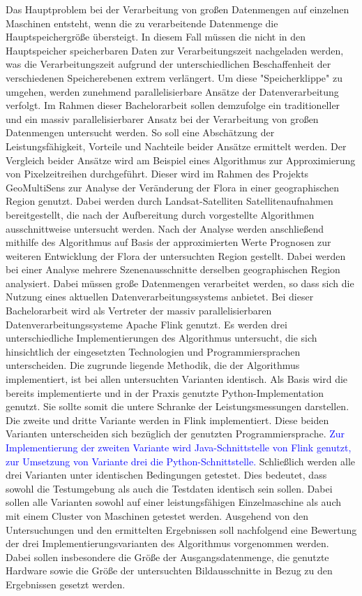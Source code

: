 \newline
Das Hauptproblem bei der Verarbeitung von großen Datenmengen auf einzelnen Maschinen entsteht, wenn die zu verarbeitende Datenmenge die Hauptspeichergröße übersteigt. In diesem Fall müssen die nicht in den Hauptspeicher speicherbaren Daten zur Verarbeitungszeit nachgeladen werden, was die Verarbeitungszeit aufgrund der unterschiedlichen Beschaffenheit der verschiedenen Speicherebenen extrem verlängert. Um diese "Speicherklippe" zu umgehen, werden zunehmend parallelisierbare Ansätze der Datenverarbeitung verfolgt.
Im Rahmen dieser Bachelorarbeit sollen demzufolge ein traditioneller und ein massiv parallelisierbarer Ansatz bei der Verarbeitung von großen Datenmengen untersucht werden. So soll eine Abschätzung der Leistungsfähigkeit, Vorteile und Nachteile beider Ansätze ermittelt werden. Der Vergleich beider Ansätze wird am Beispiel eines Algorithmus zur Approximierung von Pixelzeitreihen durchgeführt. Dieser wird im Rahmen des Projekts GeoMultiSens\cite{GeoMultiSensWebsite} zur Analyse der Veränderung der Flora in einer geographischen Region genutzt. Dabei werden durch Landsat-Satelliten Satellitenaufnahmen bereitgestellt, die nach der Aufbereitung durch vorgestellte Algorithmen ausschnittweise untersucht werden. Nach der Analyse werden anschließend mithilfe des Algorithmus auf Basis der approximierten Werte Prognosen zur weiteren Entwicklung der Flora der untersuchten Region gestellt. Dabei werden bei einer Analyse mehrere Szenenausschnitte derselben geographischen Region analysiert. Dabei müssen große Datenmengen verarbeitet werden, so dass sich die Nutzung eines aktuellen Datenverarbeitungssystems anbietet. Bei dieser Bachelorarbeit wird als Vertreter der massiv parallelisierbaren Datenverarbeitungssysteme Apache Flink genutzt.
\newline
Es werden drei unterschiedliche Implementierungen des Algorithmus untersucht, die sich hinsichtlich der eingesetzten Technologien und Programmiersprachen unterscheiden. Die zugrunde liegende Methodik, die der Algorithmus implementiert, ist bei allen untersuchten Varianten identisch. Als Basis wird die bereits implementierte und in der Praxis genutzte Python-Implementation genutzt. Sie sollte somit die untere Schranke der Leistungsmessungen darstellen. Die zweite und dritte Variante werden in Flink implementiert. Diese beiden Varianten unterscheiden sich bezüglich der genutzten Programmiersprache. \textcolor{blue}{Zur Implementierung der zweiten Variante wird Java-Schnittstelle von Flink genutzt, zur Umsetzung von Variante drei die Python-Schnittstelle.} Schließlich werden alle drei Varianten unter identischen Bedingungen getestet. Dies bedeutet, dass sowohl die Testumgebung als auch die Testdaten identisch sein sollen. Dabei sollen alle Varianten sowohl auf einer leistungsfähigen Einzelmaschine als auch mit einem Cluster von Maschinen getestet werden. Ausgehend von den Untersuchungen und den ermittelten Ergebnissen soll nachfolgend eine Bewertung der drei Implementierungsvarianten des Algorithmus vorgenommen werden. Dabei sollen insbesondere die Größe der Ausgangsdatenmenge, die genutzte Hardware sowie die Größe der untersuchten Bildausschnitte in Bezug zu den Ergebnissen gesetzt werden.

